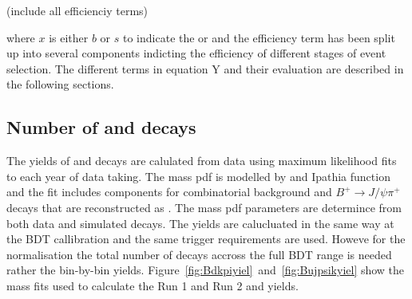 (include all efficienciy terms)

where $x$ is either $b$ or $s$ to indicate the \bs or \bd and the efficiency term has been split up into several components indicting the efficiency of different stages of event selection.  The different terms in equation Y and their evaluation are described in the following sections.


\subsection{Number of \bdkpi and \bujpsik decays}
The yields of \bujpsik and \bdkpi decays are calulated from data using maximum likelihood fits to each year of data taking. 
The \bujpsik mass pdf is modelled by and Ipathia function and the fit includes components for combinatorial background and $B^{+} \to J/\psi \pi^{+}$ decays that are reconstructed as \bukpsik. The mass pdf parameters are determince from both data and simulated decays. The \bdkpi yields are calucluated in the same way at the BDT callibration and the same trigger requirements are used. Howeve for the normalisation the total number of \bdkpi decays accross the full BDT range is needed rather the bin-by-bin yields. Figure~\ref{fig:Bdkpiyiel}~and~\ref{fig:Bujpsikyiel} show the mass fits used to calculate the Run 1 and Run 2 \bdkpi and \bujpsik yields.


